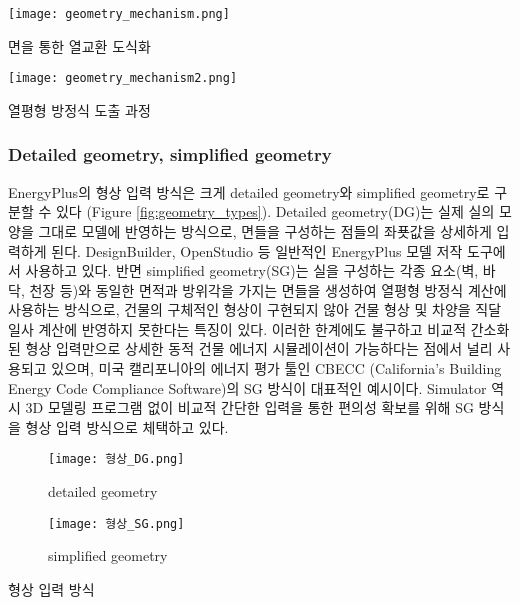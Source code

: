 \begin{defaultfigure}
  \texttt{[image: geometry\_mechanism.png]}
  \caption{면을 통한 열교환 도식화}
  \label{fig:geometry_mechanism}
\end{defaultfigure}

\begin{defaultfigure}
  \texttt{[image: geometry\_mechanism2.png]}
  \caption{열평형 방정식 도출 과정}
  \label{fig:geometry_mechanism2}
\end{defaultfigure}

\subsubsection{Detailed geometry, simplified geometry}

EnergyPlus의 형상 입력 방식은 크게 detailed geometry와 simplified geometry로 구분할 수 있다 (Figure \ref{fig:geometry_types}). Detailed geometry(DG)는 실제 실의 모양을 그대로 모델에 반영하는 방식으로, 면들을 구성하는 점들의 좌푯값을 상세하게 입력하게 된다. DesignBuilder, OpenStudio 등 일반적인 EnergyPlus 모델 저작 도구에서 사용하고 있다. 반면 simplified geometry(SG)는 실을 구성하는 각종 요소(벽, 바닥, 천장 등)와 동일한 면적과 방위각을 가지는 면들을 생성하여 열평형 방정식 계산에 사용하는 방식으로, 건물의 구체적인 형상이 구현되지 않아 건물 형상 및 차양을 직달 일사 계산에 반영하지 못한다는 특징이 있다. 이러한 한계에도 불구하고 비교적 간소화된 형상 입력만으로 상세한 동적 건물 에너지 시뮬레이션이 가능하다는 점에서 널리 사용되고 있으며, 미국 캘리포니아의 에너지 평가 툴인 CBECC (California's Building Energy Code Compliance Software)의 SG 방식\cite{cbecc}이 대표적인 예시이다. Simulator 역시 3D 모델링 프로그램 없이 비교적 간단한 입력을 통한 편의성 확보를 위해 SG 방식을 형상 입력 방식으로 체택하고 있다.

\begin{defaultfigure}
  
  \begin{subfigure}[b]{0.45\textwidth}
    \centering
    \texttt{[image: 형상\_DG.png]}
    \caption{detailed geometry}
  \end{subfigure}
  \hfill
  \begin{subfigure}[b]{0.45\textwidth}
    \centering
    \texttt{[image: 형상\_SG.png]}
    \caption{simplified geometry}
  \end{subfigure}
  
  \caption{형상 입력 방식}
  \label{fig:geometry_types}

\end{defaultfigure}

